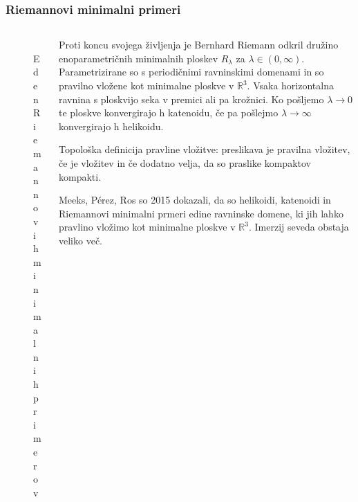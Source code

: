 \documentclass[8pt]{beamer}
\theoremstyle{definition}
\theoremstyle{remark}
\theoremstyle{plain}
\numberwithin{equation}{section}  %
\begin{document}
\begin{frame}
    \frametitle{Riemannovi minimalni primeri}

    \begin{columns}
        \begin{column}{0.4\textwidth}
            \centering
            \begin{figure}
                \includegraphics[width=16em]{../Slike/Riemann_Minimal_Example.png}
                \caption{Eden Riemannovih minimalnih primerov}
            \end{figure}
        \end{column}

        \begin{column}{0.6\textwidth}
            Proti koncu svojega življenja je Bernhard Riemann odkril družino enoparametričnih minimalnih ploskev $R_\lambda$ za $\lambda \in (0, \infty)$. Parametrizirane so s periodičnimi ravninskimi domenami in so \textcolor{red1}{pravilno vložene} kot minimalne ploskve v $\mathbb{R}^3$. Vsaka horizontalna ravnina s ploskvijo seka v premici ali pa krožnici. Ko pošljemo $\lambda \rightarrow 0$ te ploskve konvergirajo h katenoidu, če pa pošlejmo $\lambda \rightarrow \infty$ konvergirajo h helikoidu. 

            \vspace{0.8em}

            \textcolor{red1}{Topološka definicija pravline vložitve:} preslikava je pravilna vložitev, če je vložitev in če dodatno velja, da so praslike kompaktov kompakti.
            
            \vspace{0.8em}

            Meeks, Pérez, Ros so 2015 dokazali, da so helikoidi, katenoidi in Riemannovi minimalni prmeri edine ravninske domene, ki jih lahko pravlino vložimo kot minimalne ploskve v $\mathbb{R}^3$. Imerzij seveda obstaja veliko več. 
        \end{column}
    \end{columns}
    
\end{frame}
\end{document}
